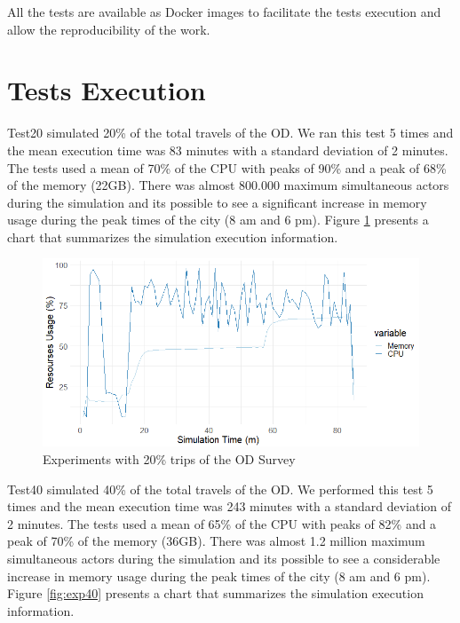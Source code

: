 All the tests are available as Docker \citep{merkel2014docker} images to facilitate the tests execution and allow the reproducibility of the work.

\section{Tests Execution}
\label{sec:tests_executions}

Test20 simulated 20\% of the total travels of the OD. We ran this test 5 times and the mean execution time was 83 minutes with a standard deviation of 2 minutes. The tests used a mean of 70\% of the CPU with peaks of 90\% and a peak of 68\% of the memory (22GB). There was almost 800.000 maximum simultaneous actors during the simulation and its possible to see a significant increase in memory usage during the peak times of the city (8 am and 6 pm). Figure \ref{fig:exp20} presents a chart that summarizes the simulation execution information. 

\begin{figure}[!htb]
\centering
\includegraphics[width=1\textwidth]{figuras/chap-exp/experiments20.png}
\caption{Experiments with 20\% trips of the OD Survey}
\label{fig:exp20}
\end{figure}

Test40 simulated 40\% of the total travels of the OD. We performed this test 5 times and the mean execution time was 243 minutes with a standard deviation of 2 minutes. The tests used a mean of 65\% of the CPU with peaks of 82\% and a peak of 70\% of the memory (36GB). There was almost 1.2 million maximum simultaneous actors during the simulation and its possible to see a considerable increase in memory usage during the peak times of the city (8 am and 6 pm). Figure \ref{fig:exp40} presents a chart that summarizes the simulation execution information. 

